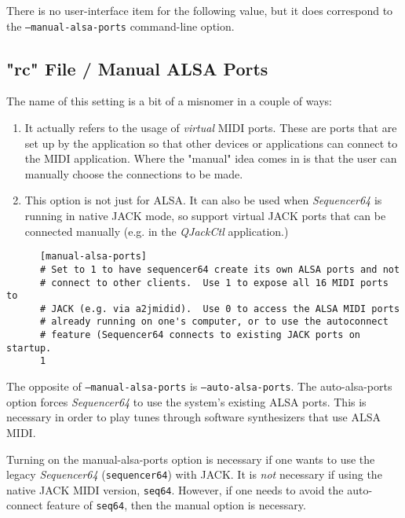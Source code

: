    There is no user-interface item for the following value, but
   it does correspond to the \texttt{--manual-alsa-ports} command-line
   option.

\subsection{"rc" File / Manual ALSA Ports}
\label{subsec:seq64_rc_file_manual_ports}

   The name of this setting is a bit of a misnomer in a couple of ways:

   \begin{enumerate}
      \item It actually refers to the usage of \textsl{virtual} MIDI ports.
         These are ports that are set up by the application so that other
         devices or applications can connect to the MIDI application.
         Where the "manual" idea comes in is that the user can manually choose
         the connections to be made.
      \item This option is not just for ALSA.  It can also be used when
         \textsl{Sequencer64} is running in native JACK mode, so support
         virtual JACK ports that can be connected manually (e.g. in the
         \textsl{QJackCtl} application.)
   \end{enumerate}

   \begin{verbatim}
      [manual-alsa-ports]
      # Set to 1 to have sequencer64 create its own ALSA ports and not
      # connect to other clients.  Use 1 to expose all 16 MIDI ports to
      # JACK (e.g. via a2jmidid).  Use 0 to access the ALSA MIDI ports
      # already running on one's computer, or to use the autoconnect
      # feature (Sequencer64 connects to existing JACK ports on startup.
      1
   \end{verbatim}

   The opposite of \texttt{--manual-alsa-ports}
   is \texttt{--auto-alsa-ports}.  The auto-alsa-ports option
   forces \textsl{Sequencer64} to use the system's existing ALSA ports.
   This is necessary in order to play tunes through software synthesizers that
   use ALSA MIDI.

   Turning on the manual-alsa-ports option is necessary if one
   wants to use the legacy \textsl{Sequencer64} (\texttt{sequencer64})
   with JACK.
   It is \textsl{not} necessary if using the native JACK MIDI version,
   \texttt{seq64}.
   However, if one needs to avoid the auto-connect feature of \texttt{seq64},
   then the manual option is necessary.

